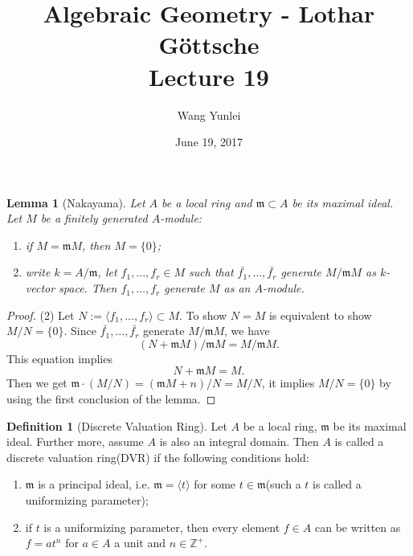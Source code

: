 \documentclass{amsart}
\theoremstyle{plain}
\newtheorem{lemma}{Lemma}
\theoremstyle{definition}
\newtheorem{definition}{Definition}
\theoremstyle{remark}
\numberwithin{equation}{section}
\begin{document}
\title[Complete-simple distributive lattices]
{Algebraic Geometry - Lothar G\"{o}ttsche \\
	Lecture 19}
\author{Wang Yunlei}
\date{June 19, 2017}
 
\maketitle
 \begin{lemma}[Nakayama]
 	Let $ A $ be a local ring and $ \mathfrak{m}\subset A $ be its maximal ideal. Let $ M $ be a finitely generated $ A $-module:
 	\begin{enumerate}
 		\item if $ M=\mathfrak{m}M $, then $ M=\lbrace 0 \rbrace $;
 		\item write $ k=A/\mathfrak{m} $, let $ f_1,\dots,f_r\in M $ such that $ \bar{f_1},\dots,\bar{f_r} $ generate $ M/\mathfrak{m}M $ as $ k $-vector space. Then $ f_1,\dots,f_r $ generate $ M $ as an  $ A $-module.
 	\end{enumerate}
 \end{lemma}
 \begin{proof}
 	(2) Let $ N:=\langle f_1,\dots,f_r \rangle\subset M $. To show $ N=M $ is equivalent to show $ M/N=\lbrace 0 \rbrace $. Since $ \bar{f_1},\dots,\bar{f_r} $ generate $ M/\mathfrak{m}M $, we have 
 	$$
 	 (N+\mathfrak{m}M)/\mathfrak{m}M=M/\mathfrak{m}M.
 	$$
 	This equation implies 
 	$$
 	N+\mathfrak{m}M=M.
 	$$ 
 	Then we get $ \mathfrak{m}\cdot (M/N)=(\mathfrak{m}M+n)/N=M/N $, it implies $ M/N=\lbrace 0\rbrace $ by using the first conclusion of the lemma.
 \end{proof}
 \begin{definition}[Discrete Valuation Ring]
 	Let $ A $ be a local ring, $ \mathfrak{m} $ be its maximal ideal. Further more, assume $ A $ is also an integral domain. Then $ A $ is called a discrete valuation ring(DVR)  if the following conditions hold:
 	\begin{enumerate}
 		\item $ \mathfrak{m} $ is a principal ideal, i.e. $ \mathfrak{m}=\langle t\rangle $ for some $ t\in \mathfrak{m} $(such a $ t $ is called a uniformizing parameter);
 		\item if $ t $ is a uniformizing parameter, then every element $ f\in A $ can be written as $ f=at^n $ for $ a\in A $ a unit and  $ n\in \mathbb{Z}^+ $.
 	\end{enumerate}
 \end{definition}
\end{document}
